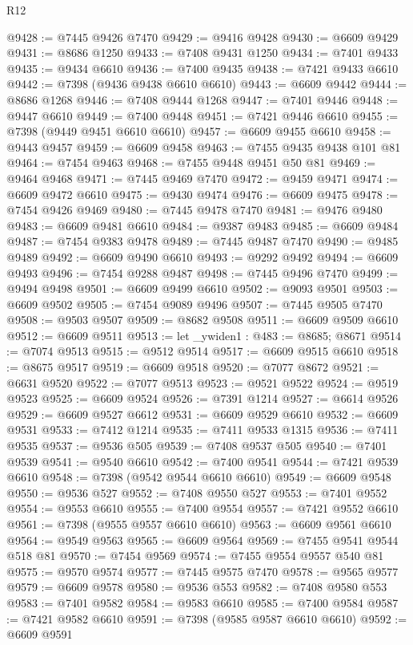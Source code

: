 \begin{lexlean}{R12}
\begin{coremodule}
{{{{{{{{{{{{{{{{{{{{{{{{{{{{{{{{{{{{{{{{{{{{{{{{{{{{{{{{{{{{{{{{{{{{{{{{{{{{{{{{{{@9428 := @7445 @9426 @7470
@9429 := @9416 @9428
@9430 := @6609 @9429
@9431 := @8686 @1250
@9433 := @7408 @9431 @1250
@9434 := @7401 @9433
@9435 := @9434 @6610
@9436 := @7400 @9435
@9438 := @7421 @9433 @6610
@9442 := @7398 (@9436 @9438 @6610 @6610)
@9443 := @6609 @9442
@9444 := @8686 @1268
@9446 := @7408 @9444 @1268
@9447 := @7401 @9446
@9448 := @9447 @6610
@9449 := @7400 @9448
@9451 := @7421 @9446 @6610
@9455 := @7398 (@9449 @9451 @6610 @6610)
@9457 := @6609 @9455 @6610
@9458 := @9443 @9457
@9459 := @6609 @9458
@9463 := @7455 @9435 @9438 @101 @81
@9464 := @7454 @9463
@9468 := @7455 @9448 @9451 @50 @81
@9469 := @9464 @9468
@9471 := @7445 @9469 @7470
@9472 := @9459 @9471
@9474 := @6609 @9472 @6610
@9475 := @9430 @9474
@9476 := @6609 @9475
@9478 := @7454 @9426 @9469
@9480 := @7445 @9478 @7470
@9481 := @9476 @9480
@9483 := @6609 @9481 @6610
@9484 := @9387 @9483
@9485 := @6609 @9484
@9487 := @7454 @9383 @9478
@9489 := @7445 @9487 @7470
@9490 := @9485 @9489
@9492 := @6609 @9490 @6610
@9493 := @9292 @9492
@9494 := @6609 @9493
@9496 := @7454 @9288 @9487
@9498 := @7445 @9496 @7470
@9499 := @9494 @9498
@9501 := @6609 @9499 @6610
@9502 := @9093 @9501
@9503 := @6609 @9502
@9505 := @7454 @9089 @9496
@9507 := @7445 @9505 @7470
@9508 := @9503 @9507
@9509 := @8682 @9508
@9511 := @6609 @9509 @6610
@9512 := @6609 @9511
@9513 := let _ywiden1 : @483 := @8685; @8671
@9514 := @7074 @9513
@9515 := @9512 @9514
@9517 := @6609 @9515 @6610
@9518 := @8675 @9517
@9519 := @6609 @9518
@9520 := @7077 @8672
@9521 := @6631 @9520
@9522 := @7077 @9513
@9523 := @9521 @9522
@9524 := @9519 @9523
@9525 := @6609 @9524
@9526 := @7391 @1214
@9527 := @6614 @9526
@9529 := @6609 @9527 @6612
@9531 := @6609 @9529 @6610
@9532 := @6609 @9531
@9533 := @7412 @1214
@9535 := @7411 @9533 @1315
@9536 := @7411 @9535
@9537 := @9536 @505
@9539 := @7408 @9537 @505
@9540 := @7401 @9539
@9541 := @9540 @6610
@9542 := @7400 @9541
@9544 := @7421 @9539 @6610
@9548 := @7398 (@9542 @9544 @6610 @6610)
@9549 := @6609 @9548
@9550 := @9536 @527
@9552 := @7408 @9550 @527
@9553 := @7401 @9552
@9554 := @9553 @6610
@9555 := @7400 @9554
@9557 := @7421 @9552 @6610
@9561 := @7398 (@9555 @9557 @6610 @6610)
@9563 := @6609 @9561 @6610
@9564 := @9549 @9563
@9565 := @6609 @9564
@9569 := @7455 @9541 @9544 @518 @81
@9570 := @7454 @9569
@9574 := @7455 @9554 @9557 @540 @81
@9575 := @9570 @9574
@9577 := @7445 @9575 @7470
@9578 := @9565 @9577
@9579 := @6609 @9578
@9580 := @9536 @553
@9582 := @7408 @9580 @553
@9583 := @7401 @9582
@9584 := @9583 @6610
@9585 := @7400 @9584
@9587 := @7421 @9582 @6610
@9591 := @7398 (@9585 @9587 @6610 @6610)
@9592 := @6609 @9591
}}}}}}}}}}}}}}}}}}}}}}}}}}}}}}}}}}}}}}}}}}}}}}}}}}}}}}}}}}}}}}}}}}}}}}}}}}}}}}}}}}
\end{coremodule}
\end{lexlean}
